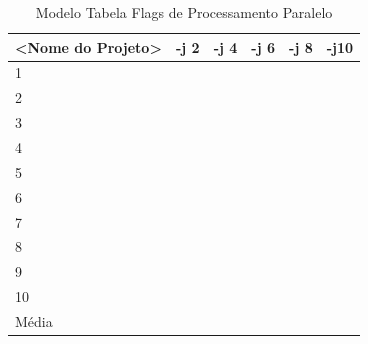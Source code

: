 \begin{table}[h]
\centering
\caption{Modelo Tabela Flags de Processamento Paralelo}
\label{my-label}
\begin{tabular}{llllll}
\hline
\textbf{<Nome do Projeto>} & \textbf{-j 2} & \textbf{-j 4} & \textbf{-j 6} & \textbf{-j 8} & \textbf{-j10}  \\ \toprule
1                                    &    &     &     &     &        \\ \midrule
2                                    &    &     &     &     &        \\ \midrule
3                                    &    &     &     &     &        \\ \midrule
4                                    &    &     &     &     &        \\ \midrule
5                                    &    &     &     &     &        \\ \midrule
6                                    &    &     &     &     &        \\ \midrule
7                                    &    &     &     &     &        \\ \midrule
8                                    &    &     &     &     &        \\ \midrule
9                                    &    &     &     &     &        \\ \midrule
10                                   &    &     &     &     &        \\ \midrule
Média                                &    &     &     &     &        \\ \bottomrule
\end{tabular}
\end{table}

